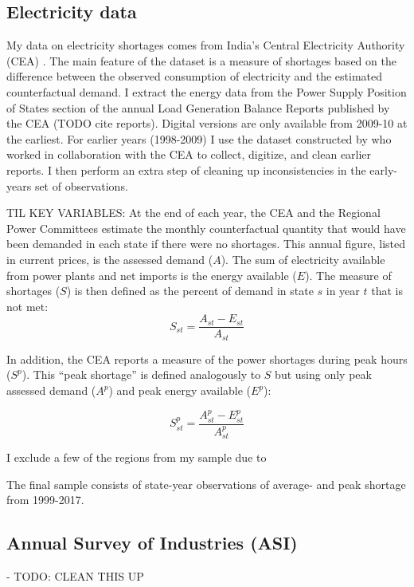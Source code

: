 \documentclass[11pt]{article}
\begin{document}
\subsection{Electricity data}%
\label{sub:energy_data}
My data on electricity shortages comes from India's Central Electricity Authority (CEA) . The main feature of the dataset is a measure of shortages based on the difference between the observed consumption of electricity and the estimated counterfactual demand. I extract the energy data from the Power Supply Position of States section of the annual Load Generation Balance Reports published by the CEA (TODO cite reports). Digital versions are only available from 2009-10 at the earliest. For earlier years (1998-2009) I use the dataset constructed by \cite{allcott_how_2016} who worked in collaboration with the CEA to collect, digitize, and clean earlier reports. I then perform an extra step of cleaning up inconsistencies in the early-years set of observations.





TIL KEY VARIABLES: At the end of each year, the CEA and the Regional Power Committees estimate the monthly counterfactual quantity that would have been demanded in each state if there were no shortages. This annual figure, listed in current prices, is the assessed demand (\(A\)). The sum of electricity available from power plants and net imports is the energy available ($E$). The measure of shortages (\(S\)) is then defined as the percent of demand in state \(s\) in year \(t\) that is not met:
\[
S_{st} = \frac{A_{st} - E_{st} }{A_{st}}
\]

In addition, the CEA reports a measure of the power shortages during peak hours (\(S^p\)). This ``peak shortage'' is defined analogously to \(S\) but using only peak assessed demand (\(A^{p}\)) and peak energy available (\(E^p\)):

\[
S^{p}_{st} = \frac{A^{p}_{st} - E^{p}_{st}}{A^{p}_{st}}
\]

I exclude a few of the regions from my sample due to 

The final sample consists of state-year observations of average- and peak shortage from 1999-2017.

\subsection{Annual Survey of Industries (ASI)}%
\label{sub:annual_survey_of_industries_asi}

- TODO: CLEAN THIS UP 
\end{document}
